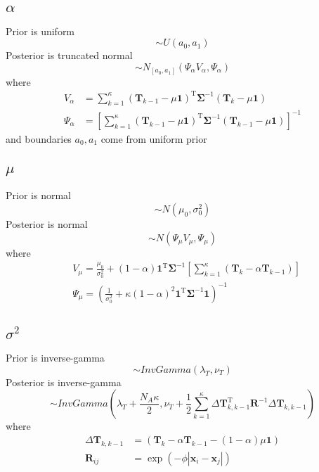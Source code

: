 \documentclass[12pt, letterpaper]{article}
\begin{document}
\subsection{$\alpha$}
Prior is uniform
\begin{equation}
	\sim U(a_0,a_1)
\end{equation} 
Posterior is truncated normal
\begin{equation}
\sim N_{\left[a_{0}, a_{1}\right]}\left(\Psi_{\alpha} V_{\alpha}, \Psi_{\alpha}\right)
\end{equation}
where
\begin{align}
V_{\alpha}&=\sum_{k=1}^{\kappa}\left(\mathbf{T}_{k-1}-\mu \mathbf{1}\right)^{\mathrm{T}} \mathbf{\Sigma}^{-1}\left(\mathbf{T}_{k}-\mu \mathbf{1}\right)\\
\Psi_{\alpha}&=\left[\sum_{k=1}^{\kappa}\left(\mathbf{T}_{k-1}-\mu \mathbf{1}\right)^{\mathrm{T}} \mathbf{\Sigma}^{-1}\left(\mathbf{T}_{k-1}-\mu \mathbf{1}\right)\right]^{-1}
\end{align}
and boundaries $a_{0}, a_{1}$ come from uniform prior


\subsection{$\mu$}
Prior is normal
\begin{equation}
	\sim N\left(\mu_{0}, \sigma_{0}^{2}\right)
\end{equation}
Posterior is normal
\begin{equation}
	\sim N\left(\Psi_{\mu} V_{\mu}, \Psi_{\mu}\right)
\end{equation}
where
\begin{align}
&V_{\mu}=\frac{\mu_{0}}{\sigma_{0}^{2}}+(1-\alpha) \mathbf{1}^{\mathrm{T}} \mathbf{\Sigma}^{-1}\left[\sum_{k=1}^{\kappa}\left(\mathbf{T}_{k}-\alpha \mathbf{T}_{k-1}\right)\right] \\
&\Psi_{\mu}=\left(\frac{1}{\sigma_{0}^{2}}+\kappa(1-\alpha)^{2} \mathbf{1}^{\mathrm{T}} \mathbf{\Sigma}^{-1} \mathbf{1}\right)^{-1}
\end{align}

\subsection{$\sigma^2$}
Prior is inverse-gamma
\begin{equation}
	\sim InvGamma \left(\lambda_{T}, \nu_{T}\right)
\end{equation}
Posterior is inverse-gamma
\begin{equation}
\sim InvGamma\left(\lambda_{T}+\frac{N_{A} \kappa}{2},
\nu_{T}+\frac{1}{2} \sum_{k=1}^{\kappa} \Delta \mathbf{T}_{k, k-1}^{\mathrm{T}} \mathbf{R}^{-1} \Delta \mathbf{T}_{k, k-1}\right)
\end{equation}
where
\begin{align}
\Delta \mathbf{T}_{k, k-1}&=\left(\mathbf{T}_{k}-\alpha \mathbf{T}_{k-1}-(1-\alpha) \mu \mathbf{1}\right)\\
\mathbf{R}_{i j}&=\exp \left(-\phi\left|\mathbf{x}_{i}-\mathbf{x}_{j}\right|\right)
\end{align}
\end{document}

